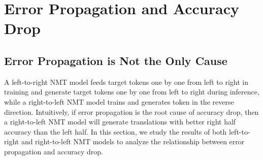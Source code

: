 \documentclass[11pt,a4paper]{article}
\begin{document}

\section{Error Propagation and Accuracy Drop}

\subsection{Error Propagation is Not the Only Cause}
\label{sec_3_measure}
A left-to-right NMT model feeds target tokens one by one from left to right in training and generate target tokens one by one from left to right during inference, while a right-to-left NMT model trains and generates token in the reverse direction. Intuitively, if error propagation is the root cause of accuracy drop, then a right-to-left NMT model will generate translations with better right half accuracy than the left half. In this section, we study the results of both left-to-right and right-to-left NMT models to analyze the relationship between error propagation and accuracy drop.
\end{document}
